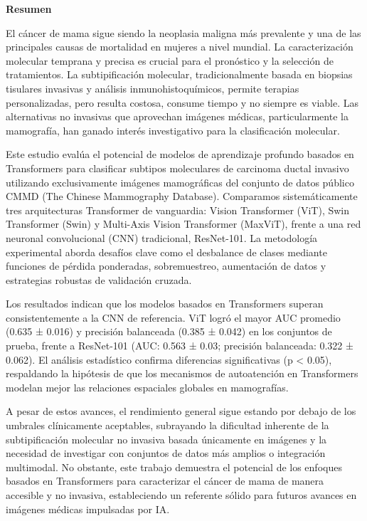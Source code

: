 \documentclass[a4paper,10pt]{book}
\begin{document}
\newpage
{}
\noindent \textbf{\large Resumen}

El cáncer de mama sigue siendo la neoplasia maligna más prevalente y una de las principales causas de mortalidad en mujeres a nivel mundial. La caracterización molecular temprana y precisa es crucial para el pronóstico y la selección de tratamientos. La subtipificación molecular, tradicionalmente basada en biopsias tisulares invasivas y análisis inmunohistoquímicos, permite terapias personalizadas, pero resulta costosa, consume tiempo y no siempre es viable. Las alternativas no invasivas que aprovechan imágenes médicas, particularmente la mamografía, han ganado interés investigativo para la clasificación molecular.

Este estudio evalúa el potencial de modelos de aprendizaje profundo basados en Transformers para clasificar subtipos moleculares de carcinoma ductal invasivo utilizando exclusivamente imágenes mamográficas del conjunto de datos público CMMD (The Chinese Mammography Database). Comparamos sistemáticamente tres arquitecturas Transformer de vanguardia: Vision Transformer (ViT), Swin Transformer (Swin) y Multi-Axis Vision Transformer (MaxViT), frente a una red neuronal convolucional (CNN) tradicional, ResNet-101. La metodología experimental aborda desafíos clave como el desbalance de clases mediante funciones de pérdida ponderadas, sobremuestreo, aumentación de datos y estrategias robustas de validación cruzada.

Los resultados indican que los modelos basados en Transformers superan consistentemente a la CNN de referencia. ViT logró el mayor AUC promedio (0.635 ± 0.016) y precisión balanceada (0.385 ± 0.042) en los conjuntos de prueba, frente a ResNet-101 (AUC: 0.563 ± 0.03; precisión balanceada: 0.322 ± 0.062). El análisis estadístico confirma diferencias significativas (p < 0.05), respaldando la hipótesis de que los mecanismos de autoatención en Transformers modelan mejor las relaciones espaciales globales en mamografías.

A pesar de estos avances, el rendimiento general sigue estando por debajo de los umbrales clínicamente aceptables, subrayando la dificultad inherente de la subtipificación molecular no invasiva basada únicamente en imágenes y la necesidad de investigar con conjuntos de datos más amplios o integración multimodal. No obstante, este trabajo demuestra el potencial de los enfoques basados en Transformers para caracterizar el cáncer de mama de manera accesible y no invasiva, estableciendo un referente sólido para futuros avances en imágenes médicas impulsadas por IA.
\end{document}
